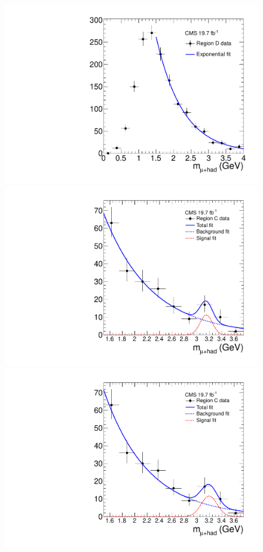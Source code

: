 \begin{figure}[hbtp]
  \begin{center}
    \includegraphics[width=\cmsFigWidth]{figures/frame_muHadMass_regD_Mu40_eta2p1}
    \includegraphics[width=\cmsFigWidth]{figures/frame_muHadMass_m1p3085_0_0_regDkFixed_Mu40_eta2p1}
    \includegraphics[width=\cmsFigWidth]{figures/frame_muHadMass_m1p4109_0_0_regCkFixed_Mu40_eta2p1}

\end{center}
\end{figure}
